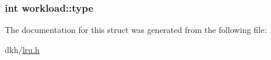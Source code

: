 \hypertarget{structworkload_aa2845ad1d10cf7ef276771aa7c038c40}{
\subsubsection[{type}]{\setlength{\rightskip}{0pt plus 5cm}int workload\+::type}}\label{structworkload_aa2845ad1d10cf7ef276771aa7c038c40}


The documentation for this struct was generated from the following file\+:\begin{DoxyCompactItemize}
\item 
dkh/\hyperlink{lru_8h}{lru.\+h}\end{DoxyCompactItemize}
